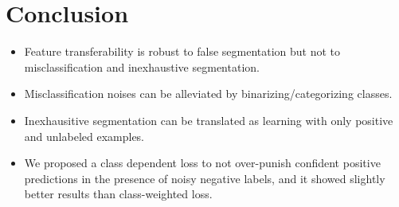 \section{Conclusion}
\label{sec:conclusion}


\begin{itemize}
  \item Feature transferability is robust to false segmentation but not to misclassification and inexhaustive segmentation.
  \item Misclassification noises can be alleviated by binarizing/categorizing classes.
  \item Inexhausitive segmentation can be translated as learning with only positive and unlabeled examples.
  \item We proposed a class dependent loss to not over-punish confident positive predictions in the presence of noisy negative labels, and it showed slightly better results than class-weighted loss.
\end{itemize}

